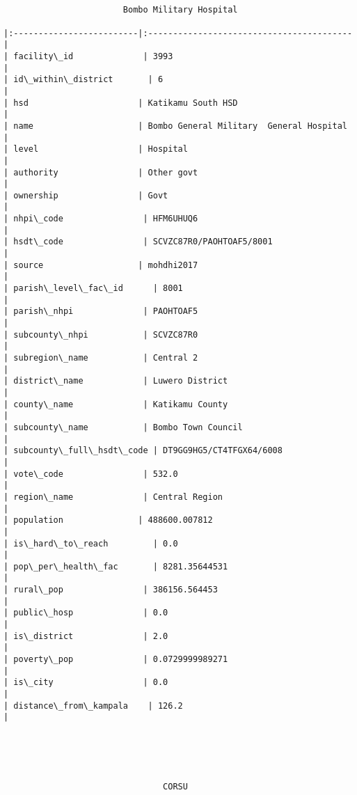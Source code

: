 \documentclass[11pt]{article}
\begin{document}
    \begin{Verbatim}[commandchars=\\\{\}]


                        Bombo Military Hospital                        

|:-------------------------|:-----------------------------------------|
| facility\_id              | 3993                                     |
| id\_within\_district       | 6                                        |
| hsd                      | Katikamu South HSD                       |
| name                     | Bombo General Military  General Hospital |
| level                    | Hospital                                 |
| authority                | Other govt                               |
| ownership                | Govt                                     |
| nhpi\_code                | HFM6UHUQ6                                |
| hsdt\_code                | SCVZC87R0/PAOHTOAF5/8001                 |
| source                   | mohdhi2017                               |
| parish\_level\_fac\_id      | 8001                                     |
| parish\_nhpi              | PAOHTOAF5                                |
| subcounty\_nhpi           | SCVZC87R0                                |
| subregion\_name           | Central 2                                |
| district\_name            | Luwero District                          |
| county\_name              | Katikamu County                          |
| subcounty\_name           | Bombo Town Council                       |
| subcounty\_full\_hsdt\_code | DT9GG9HG5/CT4TFGX64/6008                 |
| vote\_code                | 532.0                                    |
| region\_name              | Central Region                           |
| population               | 488600.007812                            |
| is\_hard\_to\_reach         | 0.0                                      |
| pop\_per\_health\_fac       | 8281.35644531                            |
| rural\_pop                | 386156.564453                            |
| public\_hosp              | 0.0                                      |
| is\_district              | 2.0                                      |
| poverty\_pop              | 0.0729999989271                          |
| is\_city                  | 0.0                                      |
| distance\_from\_kampala    | 126.2                                    |





                                CORSU                                


\end{Verbatim}
\end{document}
